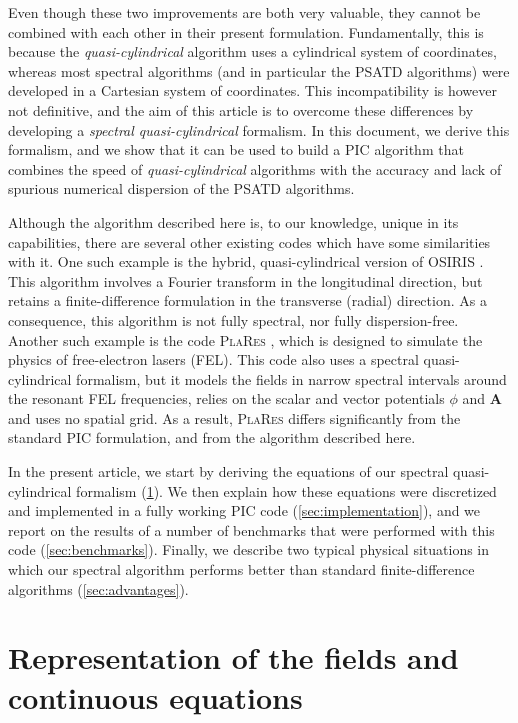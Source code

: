 \documentclass[1p,times]{elsarticle}
\renewcommand{\vec}[1]{\boldsymbol{#1}}
\begin{document}
Even though these two improvements are both very valuable, they cannot be
combined with each other in their present
formulation. Fundamentally, this is because the
\emph{quasi-cylindrical} algorithm 
uses a cylindrical system of coordinates, whereas most spectral algorithms
(and in particular the PSATD algorithms)
were developed in a Cartesian system of coordinates. This
incompatibility is however not definitive, and the aim of this article
is to overcome these differences by developing a \emph{spectral
  quasi-cylindrical} formalism. In this document, we derive this formalism,
and we show that it can be used to build a PIC algorithm that combines 
the speed of \emph{quasi-cylindrical} algorithms with
the accuracy and lack of spurious numerical dispersion of the PSATD algorithms.

Although the algorithm described here is, to our knowledge, unique in
its capabilities, there are several other existing codes
  which have some similarities with it. One such example is the
hybrid, quasi-cylindrical version of \textsc{OSIRIS} \cite{Yuarxiv2015}. This algorithm
involves a Fourier transform in the longitudinal direction, but
retains a finite-difference formulation in the transverse (radial)
direction. As a consequence, this algorithm is not fully spectral, nor
fully dispersion-free. Another such example is the code \textsc{PlaRes} 
\cite{AndriyashJCP2015}, which is designed to simulate the physics of
free-electron lasers (FEL). This code also uses a spectral quasi-cylindrical
formalism, but it models the fields in narrow spectral intervals around the
resonant FEL frequencies, relies on the scalar and vector potentials
$\phi$ and $\vec{A}$ and uses no spatial grid. As a result,
\textsc{PlaRes} differs significantly from the standard PIC
formulation, and from the algorithm described here.

In the present article, we start by deriving the equations of our
spectral quasi-cylindrical formalism (\cref{sec:theory}). We then explain
how these equations were discretized and implemented in a fully
working PIC code (\cref{sec:implementation}), and we report on the
results of a number of benchmarks that were performed with this code 
(\cref{sec:benchmarks}). Finally, we describe two typical physical situations in
which our spectral algorithm performs better than standard 
finite-difference algorithms (\cref{sec:advantages}).

\section{Representation of the fields and continuous equations}
\label{sec:theory}
\end{document}
